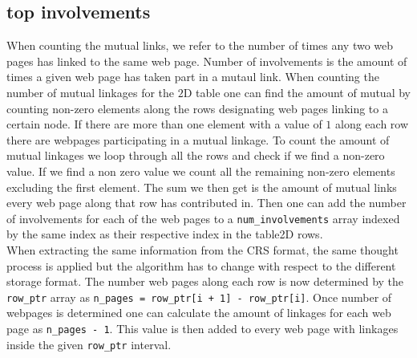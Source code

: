 \documentclass[onecolumn]{aastex62}
\begin{document}
\subsection{top involvements}
When counting the mutual links, we refer to the number of times any two web pages has linked to the same web page. Number of involvements is the amount of times a given web page has taken part in a mutaul link. When counting the number of mutual linkages for the $2$D table one can find the amount of mutual by counting non-zero elements along the rows designating web pages linking to a certain node. If there are more than one element with a value of $1$ along each row there are webpages participating in a mutual linkage. To count the amount of mutual linkages we loop through all the rows and check if we find a non-zero value. If we find a non zero value we count all the remaining non-zero elements excluding the first element. The sum we then get is the amount of mutual links every web page along that row has contributed in. Then one can add the number of involvements for each of the web pages to a \texttt{num\_involvements} array indexed by the same index as their respective index in the table2D rows.\\

When extracting the same information from the CRS format, the same thought process is applied but the algorithm has to change with respect to the different storage format. The number web pages along each row is now determined by the \texttt{row\_ptr} array as \texttt{n\_pages = row\_ptr[i + 1] - row\_ptr[i]}. Once number of webpages is determined one can calculate the amount of linkages for each web page as \texttt{n\_pages - 1}. This value is then added to every web page with linkages inside the given \texttt{row\_ptr} interval.




\end{document}

